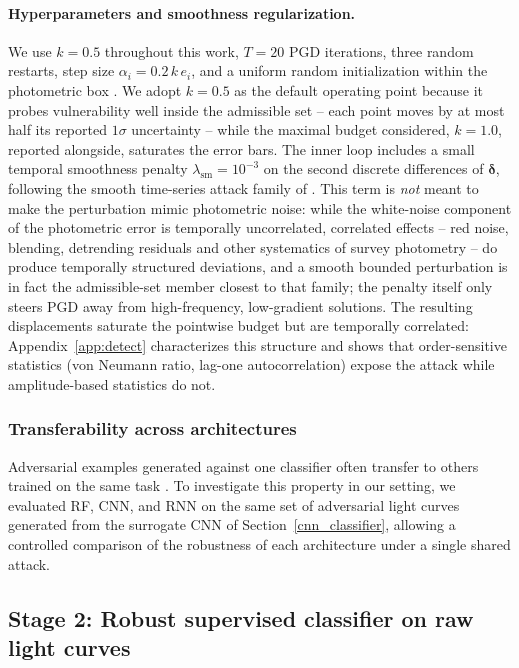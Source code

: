 \documentclass{aa}
\begin{document}
\paragraph{Hyperparameters and smoothness regularization.}
We use $k = 0.5$ throughout this work, $T = 20$ PGD iterations, three random restarts, step size $\alpha_i = 0.2\,k\,e_i$, and a uniform random initialization within the photometric box \citep{madry2017towards}. We adopt $k = 0.5$ as the default operating point because it probes vulnerability well inside the admissible set -- each point moves by at most half its reported $1\sigma$ uncertainty -- while the maximal budget considered, $k = 1.0$, reported alongside, saturates the error bars. The inner loop includes a small temporal smoothness penalty $\lambda_{\mathrm{sm}} = 10^{-3}$ on the second discrete differences of $\boldsymbol{\delta}$, following the smooth time-series attack family of \citet{pialla2022smooth}. This term is \emph{not} meant to make the perturbation mimic photometric noise: while the white-noise component of the photometric error is temporally uncorrelated, correlated effects -- red noise, blending, detrending residuals and other systematics of survey photometry -- do produce temporally structured deviations, and a smooth bounded perturbation is in fact the admissible-set member closest to that family; the penalty itself only steers PGD away from high-frequency, low-gradient solutions. The resulting displacements saturate the pointwise budget but are temporally correlated: Appendix~\ref{app:detect} characterizes this structure and shows that order-sensitive statistics (von Neumann ratio, lag-one autocorrelation) expose the attack while amplitude-based statistics do not.

\subsubsection{Transferability across architectures} \label{transfer_prop}
Adversarial examples generated against one classifier often transfer to others trained on the same task \citep{papernot2016transferability}. To investigate this property in our setting, we evaluated RF, CNN, and RNN on the same set of adversarial light curves generated from the surrogate CNN of Section~\ref{cnn_classifier}, allowing a controlled comparison of the robustness of each architecture under a single shared attack.

\subsection{Stage 2: Robust supervised classifier on raw light curves} \label{method_l5}
\end{document}

